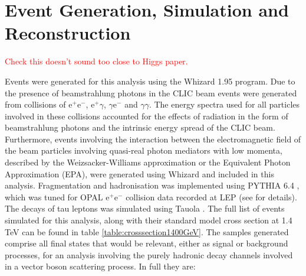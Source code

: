 
\section{Event Generation, Simulation and Reconstruction}
\label{sec:eventgenerationandbackgrounds}

\textcolor{red}{Check this doesn't sound too close to Higgs paper.}

Events were generated for this analysis using the Whizard \cite{0708.4233, hep-ph/0102195} 1.95 program.  Due to the presence of beamstrahlung photons in the CLIC beam events were generated from collisions of $\text{e}^{+}\text{e}^{-}$, $\text{e}^{+}\gamma$, $\gamma\text{e}^{-}$ and $\gamma\gamma$.  The energy spectra used for all particles involved in these collisions accounted for the effects of radiation in the form of beamstrahlung photons and the intrinsic energy spread of the CLIC beam.  Furthermore, events involving the interaction between the electromagnetic field of the beam particles involving quasi-real photon mediators with low momenta, described by the Weizsacker-Williams approximation or the Equivalent Photon Approximation (EPA), were generated using Whizard and included in this analysis.  Fragmentation and hadronisation was implemented using PYTHIA 6.4 \cite{Sjostrand:2006za}, which was tuned for OPAL $\text{e}^{+}\text{e}^{-}$ collision data recorded at LEP (see \cite{Linssen:2012hp} for details).  The decays of tau leptons was simulated using Tauola \cite{Was:2000st}.  The full list of events simulated for this analysis, along with their standard model cross section at 1.4 TeV can be found in table \ref{table:crosssection1400GeV}.  The samples generated comprise all final states that would be relevant, either as signal or background processes, for an analysis involving the purely hadronic decay channels involved in a vector boson scattering process.  In full they are:

